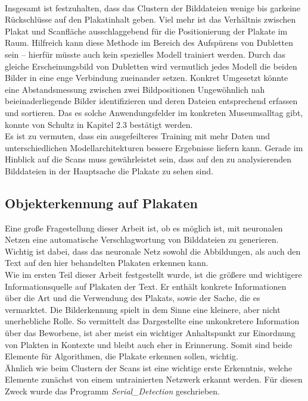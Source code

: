 \documentclass[a4paper,12pt,ngerman]{article}
\begin{document}
\\
Insgesamt ist festzuhalten, dass das Clustern der Bilddateien wenige bis garkeine Rückschlüsse auf den Plakatinhalt geben. Viel mehr ist das Verhältnis zwischen Plakat und Scanfläche ausschlaggebend für die Positionierung der Plakate im Raum. Hilfreich kann diese Methode im Bereich des Aufspürens von Dubletten sein -- hierfür müsste auch kein spezielles Modell trainiert werden. Durch das gleiche Erscheinungsbild von Dubletten wird vermutlich jedes Modell die beiden Bilder in eine enge Verbindung zueinander setzen. Konkret Umgesetzt könnte eine Abstandsmessung zwischen zwei Bildpositionen Ungewöhnlich nah beieinaderliegende Bilder identifizieren und deren Dateien entsprechend erfassen und sortieren. Das es solche Anwendungsfelder im konkreten Museumsalltag gibt, konnte von Schultz in Kapitel 2.3 bestätigt werden. \\
Es ist zu vermuten, dass ein ausgefeilteres Training mit mehr Daten und unterschiedlichen Modellarchitekturen bessere Ergebnisse liefern kann. Gerade im Hinblick auf die Scans muss gewährleistet sein, dass auf den zu analysierenden Bilddateien in der Hauptsache die Plakate zu sehen sind. \\

\subsection{Objekterkennung auf Plakaten}

Eine große Fragestellung dieser Arbeit ist, ob es möglich ist, mit neuronalen Netzen eine automatische Verschlagwortung von Bilddateien zu generieren. Wichtig ist dabei, dass das neuronale Netz sowohl die Abbildungen, als auch den Text auf den hier behandelten Plakaten erkennen kann. \\
Wie im ersten Teil dieser Arbeit festgestellt wurde, ist die größere und wichtigere Informationsquelle auf Plakaten der Text. Er enthält konkrete Informationen über die Art und die Verwendung des Plakats, sowie der Sache, die es vermarktet. Die Bilderkennung spielt in dem Sinne eine kleinere, aber nicht unerhebliche Rolle. So vermittelt das Dargestellte eine unkonkretere Information über das Beworbene, ist aber meist ein wichtiger Anhaltspunkt zur Einordnung von Plakten in Kontexte und bleibt auch eher in Erinnerung. Somit sind beide Elemente für Algorithmen, die Plakate erkennen sollen, wichtig. \\

Ähnlich wie beim Clustern der Scans ist eine wichtige erste Erkenntnis, welche Elemente zunächst von einem untrainierten Netzwerk erkannt werden. Für diesen Zweck wurde das Programm \textit{Serial\_Detection} geschrieben. \\
\end{document}
